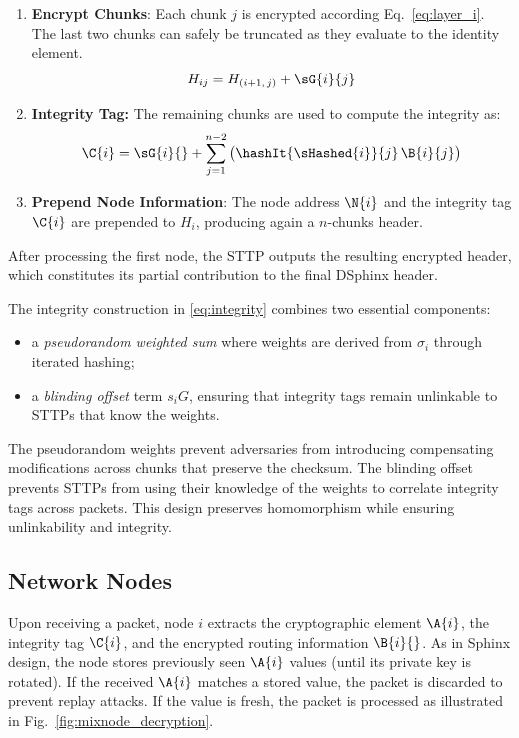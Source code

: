 \begin{enumerate}
    \item \textbf{Encrypt Chunks}: 
    Each chunk $j$ is encrypted according Eq.~\eqref{eq:layer_i}.
    The last two chunks can safely be truncated as they evaluate to the identity element.
    \begin{equation}
        H_{ij} = H_{(i+1,\,j)} + \sG{i}{j}
        \label{eq:layer_i}
    \end{equation}

    \item \textbf{Integrity Tag:} 
    The remaining chunks are used to compute the integrity as:
    \begin{equation}
        \C{i} = \sG{i}{} + \sum_{j=1}^{n-2} \big( \hashIt{\sHashed{i}}{j} \, \B{i}{j} \big)
        \label{eq:integrity}
    \end{equation}

    \item \textbf{Prepend Node Information}:
    The node address $\N{i}$ and the integrity tag $\C{i}$ are prepended to $H_i$, producing again a $n$-chunks header.
\end{enumerate}
After processing the first node, the STTP outputs the resulting encrypted header, which constitutes its partial contribution to the final DSphinx header.

\smallskip
{}
The integrity construction in \eqref{eq:integrity} combines two essential components:
\begin{itemize}
\item a \emph{pseudorandom weighted sum} where weights are derived from $\sigma_i$ through iterated hashing;
\item a \emph{blinding offset} term $s_i G$, ensuring that integrity tags remain unlinkable to STTPs that know the weights.
\end{itemize}
The pseudorandom weights prevent adversaries from introducing compensating modifications across chunks that preserve the checksum.
The blinding offset prevents STTPs from using their knowledge of the weights to correlate integrity tags across packets.
This design preserves homomorphism while ensuring unlinkability and integrity.


\subsection{Network Nodes}
Upon receiving a packet, node $i$ extracts the cryptographic element $\A{i}$, the integrity tag $\C{i}$, and the encrypted routing information $\B{i}{}$.  
As in Sphinx design, the node stores previously seen $\A{i}$ values (until its private key is rotated).
If the received $\A{i}$ matches a stored value, the packet is discarded to prevent replay attacks.  
If the value is fresh, the packet is processed as illustrated in Fig.~\ref{fig:mixnode_decryption}.

